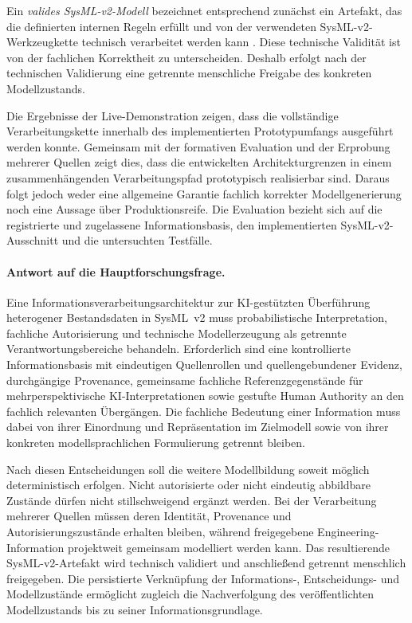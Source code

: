 Ein \emph{valides SysML-v2-Modell} bezeichnet entsprechend zunächst ein
Artefakt, das die definierten internen Regeln erfüllt und von der verwendeten
SysML-v2-Werkzeugkette technisch verarbeitet werden kann
\cite{SysMLv2,Cibrian.2025b}. Diese technische Validität ist von der
fachlichen Korrektheit zu unterscheiden. Deshalb erfolgt nach der technischen
Validierung eine getrennte menschliche Freigabe des konkreten
Modellzustands.

Die Ergebnisse der Live-Demonstration zeigen, dass die vollständige
Verarbeitungskette innerhalb des implementierten Prototypumfangs ausgeführt
werden konnte. Gemeinsam mit der formativen Evaluation und der Erprobung
mehrerer Quellen zeigt dies, dass die entwickelten Architekturgrenzen in
einem zusammenhängenden Verarbeitungspfad prototypisch realisierbar sind.
Daraus folgt jedoch weder eine allgemeine Garantie fachlich korrekter
Modellgenerierung noch eine Aussage über Produktionsreife. Die Evaluation
bezieht sich auf die registrierte und zugelassene Informationsbasis, den
implementierten SysML-v2-Ausschnitt und die untersuchten Testfälle.

\paragraph{Antwort auf die Hauptforschungsfrage.}

Eine Informationsverarbeitungsarchitektur zur KI-gestützten Überführung
heterogener Bestandsdaten in SysML~v2 muss probabilistische Interpretation,
fachliche Autorisierung und technische Modellerzeugung als getrennte
Verantwortungsbereiche behandeln. Erforderlich sind eine kontrollierte
Informationsbasis mit eindeutigen Quellenrollen und quellengebundener Evidenz,
durchgängige Provenance, gemeinsame fachliche Referenzgegenstände für
mehrperspektivische KI-Interpretationen sowie gestufte Human Authority an den
fachlich relevanten Übergängen. Die fachliche Bedeutung einer Information
muss dabei von ihrer Einordnung und Repräsentation im Zielmodell sowie von
ihrer konkreten modellsprachlichen Formulierung getrennt bleiben.

Nach diesen Entscheidungen soll die weitere Modellbildung soweit möglich
deterministisch erfolgen. Nicht autorisierte oder nicht eindeutig
abbildbare Zustände dürfen nicht stillschweigend ergänzt werden. Bei der
Verarbeitung mehrerer Quellen müssen deren Identität, Provenance und
Autorisierungszustände erhalten bleiben, während freigegebene
Engineering-Information projektweit gemeinsam modelliert werden kann. Das
resultierende SysML-v2-Artefakt wird technisch validiert und anschließend
getrennt menschlich freigegeben. Die persistierte Verknüpfung der
Informations-, Entscheidungs- und Modellzustände ermöglicht zugleich die
Nachverfolgung des veröffentlichten Modellzustands bis zu seiner
Informationsgrundlage.

